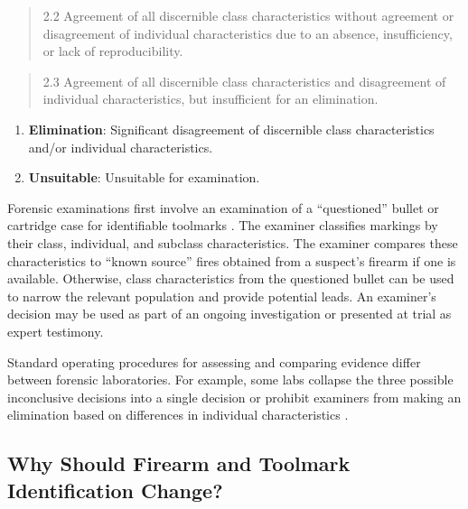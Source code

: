 \documentclass[11pt,]{isuthesis}
\begin{document}
\begin{quote}
2.2 Agreement of all discernible class characteristics without agreement or disagreement of individual characteristics due to an absence, insufficiency, or lack of reproducibility.
\end{quote}

\begin{quote}
2.3 Agreement of all discernible class characteristics and disagreement of individual characteristics, but insufficient for an elimination.
\end{quote}

\begin{enumerate}
\def\labelenumi{\arabic{enumi}.}
\setcounter{enumi}{2}
\item
  \textbf{Elimination}: Significant disagreement of discernible class characteristics and/or individual characteristics.
\item
  \textbf{Unsuitable}: Unsuitable for examination.
\end{enumerate}

Forensic examinations first involve an examination of a ``questioned'' bullet or cartridge case for identifiable toolmarks \citep{Thompson2017}.
The examiner classifies markings by their class, individual, and subclass characteristics.
The examiner compares these characteristics to ``known source'' fires obtained from a suspect's firearm if one is available.
Otherwise, class characteristics from the questioned bullet can be used to narrow the relevant population and provide potential leads.
An examiner's decision may be used as part of an ongoing investigation or presented at trial as expert testimony.

Standard operating procedures for assessing and comparing evidence differ between forensic laboratories.
For example, some labs collapse the three possible inconclusive decisions into a single decision \citep{Neuman2022} or prohibit examiners from making an elimination based on differences in individual characteristics \citep{Duez2017}.

\hypertarget{why-should-firearm-and-toolmark-identification-change}{%
\subsection{Why Should Firearm and Toolmark Identification Change?}\label{why-should-firearm-and-toolmark-identification-change}}
\end{document}
